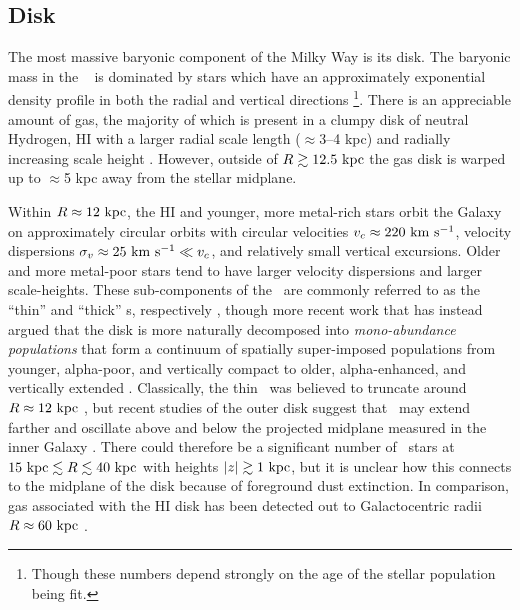 \subsection{Disk}

The most massive baryonic component of the Milky Way is its disk. The baryonic mass in the \mwdisk\ \citep[$M_d \approx 5 \times 10^{10}~\msun$;][]{mcmillan11, todo} is dominated by stars which have an approximately exponential density profile in both the radial and vertical directions \citep[with scale lengths of $\approx$2--3 kpc and $\approx$200--400 pc, respectively; ][]{mcmillan11, bovy12-spatialMAP, todo}\footnote{Though these numbers depend strongly on the age of the stellar population being fit.}. There is an appreciable amount of  gas, the majority of which is present in a clumpy disk of neutral Hydrogen, HI \citep[$M_{\rm HI} \approx 8 \times 10^9~\msun$;][]{kalberla09} with a larger radial scale length ($\approx$3--4 kpc) and radially increasing scale height \citep[$\approx$100 pc at $R=8~\kpc$ to $\approx$1 kpc at $R=25~\kpc$;][]{wouterloot90, merrifield92}. However, outside of $R \gtrsim 12.5~\mathrm{kpc}$ the gas disk is warped up to $\approx$5 kpc away from the stellar midplane. 

Within $R\approx 12~\mathrm{kpc}$, the HI and younger, more metal-rich stars orbit the Galaxy on approximately circular orbits with circular velocities $v_c \approx 220~\mathrm{km}~\mathrm{s}^{-1}$, velocity dispersions $\sigma_v \approx 25~\mathrm{km}~\mathrm{s}^{-1} \ll v_c$, and relatively small vertical excursions. Older and more metal-poor stars tend to have larger velocity dispersions and larger scale-heights. These sub-components of the \mwdisk\ are commonly referred to as the ``thin'' and ``thick'' \mwdisk s, respectively \citep{todo}, though more recent work that has instead argued that the disk is more naturally decomposed into \emph{mono-abundance populations} that form a continuum of spatially super-imposed populations from younger, alpha-poor, and vertically compact to older, alpha-enhanced, and vertically extended \citep[see, e.g., Figure~12 and Section~6 in][]{rixbovy13}. Classically, the thin \mwdisk\ was believed to truncate around $R \approx 12~\mathrm{kpc}$ \citep{todo}, but recent studies of the outer disk suggest that \mwdisk\ may extend farther and oscillate above and below the projected midplane measured in the inner Galaxy \citep{xu15, apw15-triand}. There could therefore be a significant number of \mwdisk\ stars at $15~\mathrm{kpc} \lesssim R \lesssim 40~\mathrm{kpc}$ with heights $|z| \gtrsim 1~\mathrm{kpc}$, but it is unclear how this connects to the midplane of the disk because of foreground dust extinction. In comparison, gas associated with the HI disk has been detected out to Galactocentric radii $R \approx 60~\mathrm{kpc}$ \citep{kalberla08}.


